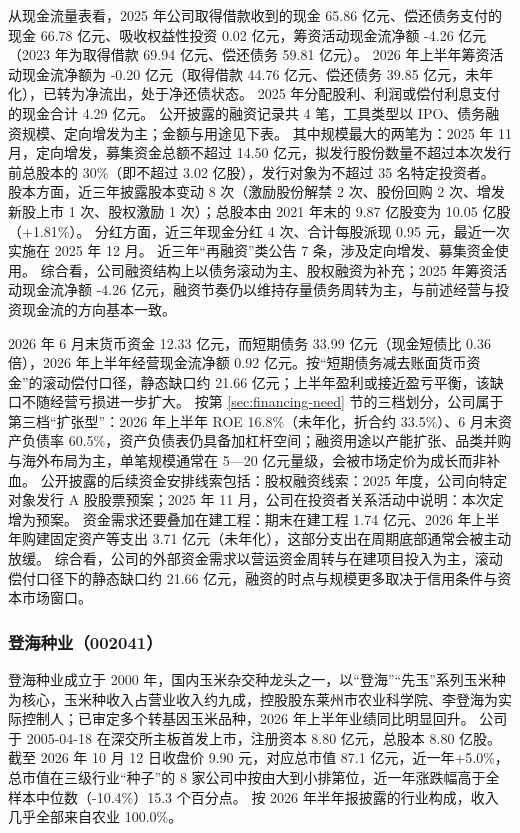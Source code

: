  从现金流量表看，2025 年公司取得借款收到的现金 65.86 亿元、偿还债务支付的现金 66.78 亿元、吸收权益性投资 0.02 亿元，筹资活动现金流净额 -4.26 亿元（2023 年为取得借款 69.94 亿元、偿还债务 59.81 亿元）。 2026 年上半年筹资活动现金流净额为 -0.20 亿元（取得借款 44.76 亿元、偿还债务 39.85 亿元，未年化），已转为净流出，处于净还债状态。 2025 年分配股利、利润或偿付利息支付的现金合计 4.29 亿元。 公开披露的融资记录共 4 笔，工具类型以 IPO、债务融资规模、定向增发为主；金额与用途见下表。 其中规模最大的两笔为：2025 年 11 月，定向增发，募集资金总额不超过 14.50 亿元，拟发行股份数量不超过本次发行前总股本的 30\%（即不超过 3.02 亿股），发行对象为不超过 35 名特定投资者。 股本方面，近三年披露股本变动 8 次（激励股份解禁 2 次、股份回购 2 次、增发新股上市 1 次、股权激励 1 次）；总股本由 2021 年末的 9.87 亿股变为 10.05 亿股（+1.81\%）。 分红方面，近三年现金分红 4 次、合计每股派现 0.95 元，最近一次实施在 2025 年 12 月。 近三年“再融资”类公告 7 条，涉及定向增发、募集资金使用。 综合看，公司融资结构上以债务滚动为主、股权融资为补充；2025 年筹资活动现金流净额 -4.26 亿元，融资节奏仍以维持存量债务周转为主，与前述经营与投资现金流的方向基本一致。

 2026 年 6 月末货币资金 12.33 亿元，而短期债务 33.99 亿元（现金短债比 0.36 倍），2026 年上半年经营现金流净额 0.92 亿元。按“短期债务减去账面货币资金”的滚动偿付口径，静态缺口约 21.66 亿元；上半年盈利或接近盈亏平衡，该缺口不随经营亏损进一步扩大。 按第 \ref{sec:financing-need} 节的三档划分，公司属于第三档“扩张型”：2026 年上半年 ROE 16.8\%（未年化，折合约 33.5\%）、6 月末资产负债率 60.5\%，资产负债表仍具备加杠杆空间；融资用途以产能扩张、品类并购与海外布局为主，单笔规模通常在 5---20 亿元量级，会被市场定价为成长而非补血。 公开披露的后续资金安排线索包括：股权融资线索：2025 年度，公司向特定对象发行 A 股股票预案；2025 年 11 月，公司在投资者关系活动中说明：本次定增为预案。 资金需求还要叠加在建工程：期末在建工程 1.74 亿元、2026 年上半年购建固定资产等支出 3.71 亿元（未年化），这部分支出在周期底部通常会被主动放缓。 综合看，公司的外部资金需求以营运资金周转与在建项目投入为主，滚动偿付口径下的静态缺口约 21.66 亿元，融资的时点与规模更多取决于信用条件与资本市场窗口。




\subsubsection{登海种业（002041）}
\label{co:002041}

 登海种业成立于 2000 年，国内玉米杂交种龙头之一，以“登海”“先玉”系列玉米种为核心，玉米种收入占营业收入约九成，控股股东莱州市农业科学院、李登海为实际控制人；已审定多个转基因玉米品种，2026 年上半年业绩同比明显回升。 公司于 2005-04-18 在深交所主板首发上市，注册资本 8.80 亿元，总股本 8.80 亿股。 截至 2026 年 10 月 12 日收盘价 9.90 元，对应总市值 87.1 亿元，近一年+5.0\%，总市值在三级行业“种子”的 8 家公司中按由大到小排第位，近一年涨跌幅高于全样本中位数（-10.4\%）15.3 个百分点。 按 2026 年半年报披露的行业构成，收入几乎全部来自农业 100.0\%。

